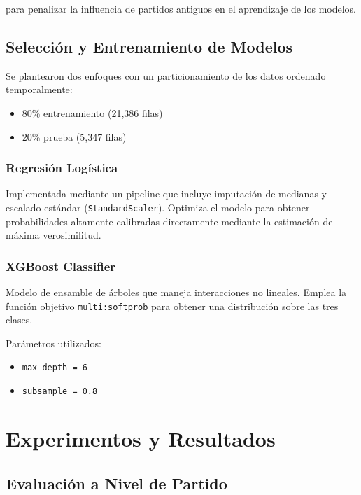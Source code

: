 \documentclass[conference]{IEEEtran}
\begin{document}
	para penalizar la influencia de partidos antiguos en el aprendizaje de los modelos.
	
	\subsection{Selección y Entrenamiento de Modelos}
	
	Se plantearon dos enfoques con un particionamiento de los datos ordenado temporalmente:
	
	\begin{itemize}
		\item 80\% entrenamiento (21,386 filas)
		\item 20\% prueba (5,347 filas)
	\end{itemize}
	
	\subsubsection{Regresión Logística}
	
	Implementada mediante un pipeline que incluye imputación de medianas y escalado estándar (\texttt{StandardScaler}). Optimiza el modelo para obtener probabilidades altamente calibradas directamente mediante la estimación de máxima verosimilitud.
	
	\subsubsection{XGBoost Classifier}
	
	Modelo de ensamble de árboles que maneja interacciones no lineales. Emplea la función objetivo \texttt{multi:softprob} para obtener una distribución sobre las tres clases.
	
	Parámetros utilizados:
	
	\begin{itemize}
		\item \texttt{max\_depth = 6}
		\item \texttt{subsample = 0.8}
	\end{itemize}
	
	\section{Experimentos y Resultados}
	
	\subsection{Evaluación a Nivel de Partido}
	
\end{document}
